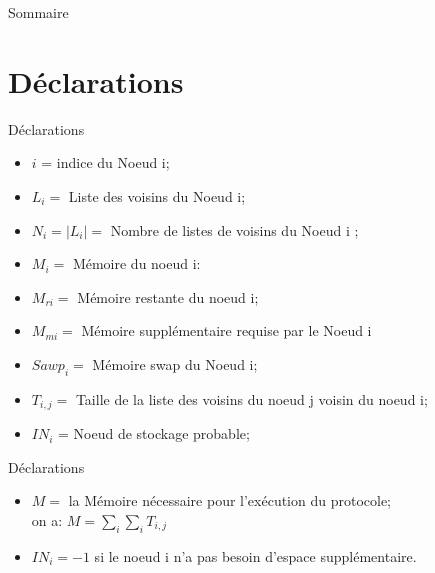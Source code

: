 \documentclass[10pt, c]{beamer}
\begin{document}
\begin{frame}{\scriptsize Sommaire}
\transwipe
\scriptsize
  \tableofcontents
\end{frame}

\section{Déclarations}
		\begin{frame}{Déclarations}
		\transwipe
	
		\vspace{-0.25cm}
				 \begin{itemize}
				 \item $i$ = indice du Noeud i;
			 	 \item $L_{i} = $ Liste des voisins du Noeud i;
                 \item $N_{i} = \vert L_{i} \vert = $ Nombre de listes de
                 voisins du Noeud i ;
                 \item $M_{i} = $ Mémoire du noeud i:
                 \item $M_{ri} = $ Mémoire restante du noeud i;
                 \item $M_{mi} = $ Mémoire supplémentaire requise par le Noeud i
                 \item $Sawp_{i} =$ Mémoire swap du  Noeud i;
                 \item $T_{i,j} = $ Taille de la liste des voisins du noeud j voisin du noeud i;
                 \item $IN_i$ = Noeud de stockage probable;
			 	\end{itemize}
		\end{frame}
		\begin{frame}{Déclarations}
	        \begin{itemize}
	             \item $M = $ la Mémoire nécessaire pour l'exécution du protocole;\\ on a: $M = \sum_{i}\sum_{i}T_{i,j}$
	             \item $IN_{i} = -1 $ si le noeud i n'a pas besoin d'espace supplémentaire.
	        \end{itemize}
	    \end{frame}
		
	
\end{document}
